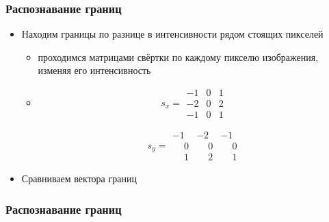 \documentclass[xetex,mathserif,serif]{beamer}
\begin{document}
\begin{frame}
	\frametitle{Распознавание границ}

	\begin{itemize}
		\item Находим границы по разнице в интенсивности рядом стоящих пикселей
		      \begin{itemize}
			      \item проходимся матрицами свёртки по каждому пикселю изображения, изменяя его интенсивность
			      \item
			            $$s_{x}=\begin{matrix}
					            -1 & 0 & 1 \\
					            -2 & 0 & 2 \\
					            -1 & 0 & 1
				            \end{matrix}$$

                        $$s_{y}=\begin{matrix}

					            -1 & -2 & -1 \\
					             \phantom{-}0 & \phantom{-}0 & \phantom{-}0  \\
					             \phantom{-}1 & \phantom{-}2 & \phantom{-}1
				            \end{matrix}$$
		      \end{itemize}
		\item Сравниваем вектора границ
	\end{itemize}
\end{frame}



\begin{frame}
	\frametitle{Распознавание границ}

	\begin{figure}[]
		\centering
		\hfill
	\end{figure}
\end{frame}
\end{document}
